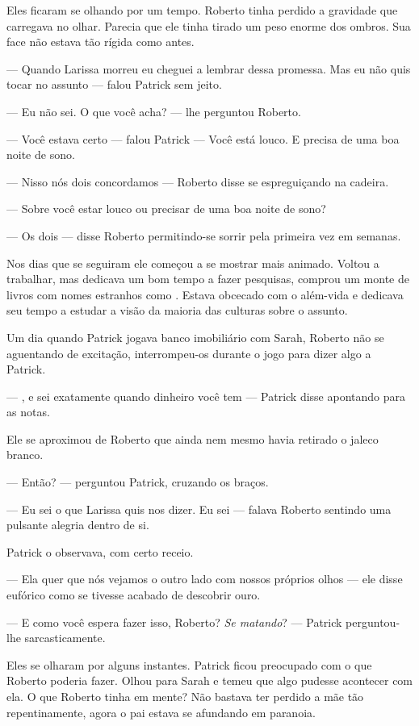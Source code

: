 Eles ficaram se olhando por um tempo. Roberto tinha perdido a gravidade que carregava no olhar. Parecia que ele tinha tirado um peso enorme dos ombros. Sua face não estava tão rígida como antes.

--- Quando Larissa morreu eu cheguei a lembrar dessa promessa. Mas eu não quis tocar no assunto --- falou Patrick\mudanca{,} sem jeito.

--- Eu não sei. O que você acha? --- lhe perguntou Roberto.

--- Você estava certo --- falou Patrick --- Você está louco. E precisa de uma boa noite de sono.

--- Nisso nós dois concordamos --- Roberto disse se espreguiçando na cadeira.

--- Sobre você estar louco ou precisar de uma boa noite de sono?

--- Os dois --- disse Roberto permitindo-se sorrir pela primeira vez em semanas.

Nos dias que se seguiram ele começou a se mostrar mais animado. Voltou a trabalhar, mas dedicava um bom tempo a fazer pesquisas, comprou um monte de livros com nomes estranhos como . Estava obcecado com o além-vida e dedicava seu tempo a estudar a visão da maioria das culturas sobre o assunto.

Um dia\mudanca{,} quando Patrick jogava banco imobiliário com Sarah, Roberto não se aguentando de excitação, interrompeu-os durante o jogo para dizer algo a Patrick.

--- , e sei exatamente quando dinheiro você tem --- Patrick disse apontando para as notas.

Ele se aproximou de Roberto que ainda nem mesmo havia retirado o jaleco branco.

--- Então? --- perguntou Patrick, cruzando os braços.

--- Eu sei o que Larissa quis nos dizer. Eu sei --- falava Roberto sentindo uma pulsante alegria dentro de si.

Patrick o observava, com certo receio.

--- Ela quer que nós vejamos o outro lado com nossos próprios olhos --- ele disse eufórico como se tivesse acabado de descobrir ouro.

--- E como você espera fazer isso, Roberto? \emph{Se matando}? --- Patrick perguntou-lhe sarcasticamente.

Eles se olharam por alguns instantes. Patrick ficou preocupado com o que Roberto poderia fazer. Olhou para Sarah e temeu que algo pudesse acontecer com ela. O que Roberto tinha em mente? Não bastava ter perdido a mãe tão repentinamente, agora o pai estava se afundando em paranoia.

